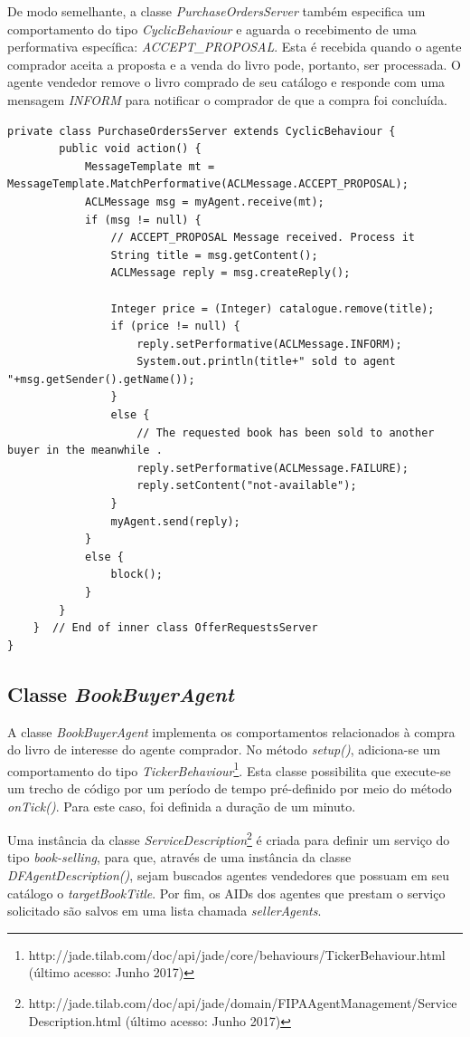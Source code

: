 De modo semelhante, a classe \textit{PurchaseOrdersServer} também especifica um comportamento do tipo \textit{CyclicBehaviour} e aguarda o recebimento de uma performativa específica: \textit{ACCEPT\_PROPOSAL}. Esta é recebida quando o agente comprador aceita a proposta e a venda do livro pode, portanto, ser processada. O agente vendedor remove o livro comprado de seu catálogo e responde com uma mensagem \textit{INFORM} para notificar o comprador de que a compra foi concluída.


\begin{lstlisting}[firstnumber=144]
	private class PurchaseOrdersServer extends CyclicBehaviour {
		public void action() {
			MessageTemplate mt = MessageTemplate.MatchPerformative(ACLMessage.ACCEPT_PROPOSAL);
			ACLMessage msg = myAgent.receive(mt);
			if (msg != null) {
				// ACCEPT_PROPOSAL Message received. Process it
				String title = msg.getContent();
				ACLMessage reply = msg.createReply();

				Integer price = (Integer) catalogue.remove(title);
				if (price != null) {
					reply.setPerformative(ACLMessage.INFORM);
					System.out.println(title+" sold to agent "+msg.getSender().getName());
				}
				else {
					// The requested book has been sold to another buyer in the meanwhile .
					reply.setPerformative(ACLMessage.FAILURE);
					reply.setContent("not-available");
				}
				myAgent.send(reply);
			}
			else {
				block();
			}
		}
	}  // End of inner class OfferRequestsServer
}
\end{lstlisting}


		

\subsection{Classe \textit{BookBuyerAgent}}

A classe \textit{BookBuyerAgent} implementa os comportamentos relacionados à compra do livro de interesse do agente comprador. No método \textit{setup()}, adiciona-se um comportamento do tipo \textit{TickerBehaviour}\footnote{http://jade.tilab.com/doc/api/jade/core/behaviours/TickerBehaviour.html (último acesso: Junho 2017)}. Esta classe possibilita que execute-se um trecho de código por um período de tempo pré-definido por meio do método \textit{onTick()}. Para este caso, foi definida a duração de um minuto.

Uma instância da classe \textit{ServiceDescription}\footnote{http://jade.tilab.com/doc/api/jade/domain/FIPAAgentManagement/ServiceDescription.html (último acesso: Junho 2017)} é criada para definir um serviço do tipo  \textit{book-selling}, para que, através de uma instância da classe \textit{DFAgentDescription()}, sejam buscados agentes vendedores que possuam em seu catálogo o \textit{targetBookTitle}. Por fim, os AIDs dos agentes que prestam o serviço solicitado são salvos em uma lista chamada \textit{sellerAgents}.

